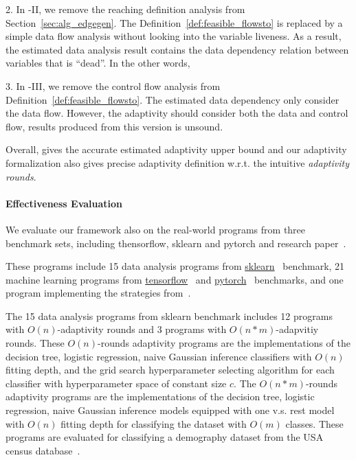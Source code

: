 2. In {\THESYSTEM}-II, we remove the reaching definition analysis from Section~\ref{sec:alg_edgegen}.
The Definition~\ref{def:feasible_flowsto} is replaced by a simple data flow analysis without looking into the variable liveness.
As a result, the estimated data analysis result contains the data dependency relation between variables that is ``dead''. In the other words, 

3. In {\THESYSTEM}-III, we remove the control flow analysis from Definition~\ref{def:feasible_flowsto}.
The estimated data dependency only consider the data flow.
However, the adaptivity should consider both the data and control flow, results produced from this version is unsound.

Overall, {\THESYSTEM} gives the accurate estimated
adaptivity upper bound and our adaptivity formalization also gives precise adaptivity definition w.r.t. the intuitive \emph{adaptivity rounds}.



\paragraph{Effectiveness Evaluation}
We evaluate our framework also on the real-world programs from
three benchmark sets, including thensorflow, sklearn and pytorch and research paper~\cite{Jamieson2015TheAO}.


These programs include  
15 data analysis programs 
from \hyperlink{https://github.com/scikit-learn/scikit-learn/tree/main/examples}{sklearn}~\cite{SklearnBenchmark} benchmark,
21 machine learning programs
from \hyperlink{https://github.com/tensorflow/tensorflow/tree/master/tensorflow/examples}{tensorflow}~\cite{TensorflowBenchmark} 
and \hyperlink{https://github.com/pytorch/pytorch}{pytorch}~\cite{PytorchBenchmark}
benchmarks,
and {one program implementing the strategies from~\cite{Jamieson2015TheAO}}.

The 15 data analysis programs 
from sklearn benchmark includes 12 programs with $O(n)$-adaptivity rounds
and 3 programs with $O(n*m)$-adapvitiy rounds.
These $O(n)$-rounds adaptivity programs are
the
implementations of the decision tree, logistic regression, naive Gaussian inference classifiers
with $O(n)$ fitting depth,
and the grid search hyperparameter selecting algorithm for each classifier with 
hyperparameter space of constant size $c$.
The $O(n*m)$-rounds adaptivity programs are
the implementations of the  decision tree, logistic regression, naive Gaussian inference models equipped with one v.s. rest model with $O(n)$ fitting depth for classifying the dataset with $O(m)$ classes.
These programs are evaluated for classifying a demography dataset from 
the USA census database~\cite{CensusDatabase}.


